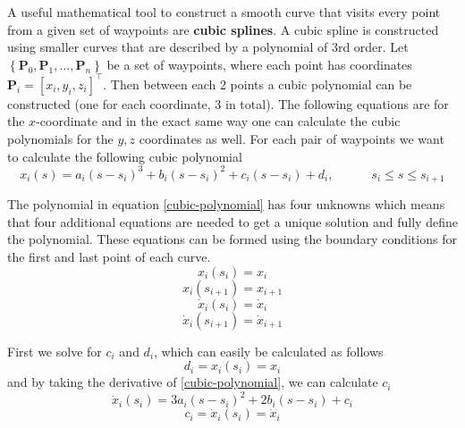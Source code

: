 A useful mathematical tool to construct a smooth curve that visits every point from a given set of waypoints are \textbf{cubic splines}. A cubic spline is 
constructed using smaller curves that are described by a polynomial of 3rd order. Let $\left\lbrace \mathbf{P}_0, \mathbf{P}_1, \ldots , \mathbf{P}_n \right\rbrace$ 
be a set of waypoints, where each point has coordinates $\mathbf{P}_i = [x_i, y_i, z_i]^\top$. Then between each 2 points a cubic 
polynomial can be constructed (one for each coordinate, 3 in total). The following equations are for the $x$-coordinate and in the exact same way one can 
calculate the cubic polynomials for the $y,z$ coordinates as well. For each pair of waypoints we want to calculate the following cubic polynomial
\begin{equation}
\label{cubic-polynomial}
x_i(s) = a_i(s-s_i)^3 + b_i(s-s_i)^2 + c_i(s-s_i) + d_i, \hspace{3em} s_i \leqslant s \leqslant s_{i+1}
\end{equation}

The polynomial in equation \ref{cubic-polynomial} has four unknowns which means that four additional equations are needed to get a unique solution and fully 
define the polynomial. These equations can be formed using the boundary conditions for the first and last point of each curve.
\begin{equation}
x_i(s_i) = x_i
\end{equation}
\begin{equation}
x_i(s_{i+1}) = x_{i+1}
\end{equation}
\begin{equation}
\dot{x}_i(s_i) = \dot{x}_i
\end{equation}
\begin{equation}
\dot{x}_i(s_{i+1}) = \dot{x}_{i+1}
\end{equation}

First we solve for $c_i$ and $d_i$, which can easily be calculated as follows
\begin{equation}
\label{di-eq}
d_i = x_i(s_i) = x_i
\end{equation}
and by taking the derivative of \ref{cubic-polynomial}, we can calculate $c_i$
\begin{equation}
\label{cubic-polynomial-first-derivative}
\dot{x}_i(s_i) = 3a_i(s-s_i)^2 + 2b_i(s-s_i) + c_i
\end{equation}
\begin{equation}
\label{ci-eq}
c_i = \dot{x}_i(s_i) = \dot{x}_i
\end{equation}

